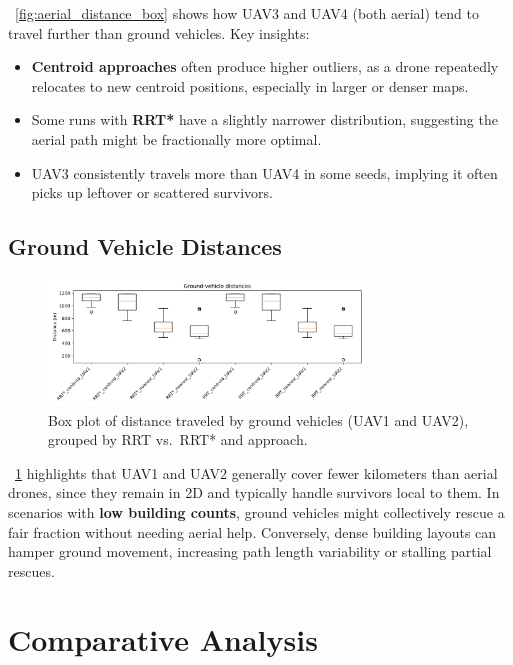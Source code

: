 \documentclass[12pt,a4paper]{report}
\begin{document}
\noindent
\figurename~\ref{fig:aerial_distance_box} shows how UAV3 and UAV4 (both aerial) 
tend to travel further than ground vehicles. Key insights:
\begin{itemize}
    \item \textbf{Centroid approaches} often produce higher outliers, as a drone 
          repeatedly relocates to new centroid positions, especially in larger or denser maps.
    \item Some runs with \textbf{RRT*} have a slightly narrower distribution, 
          suggesting the aerial path might be fractionally more optimal.
    \item UAV3 consistently travels more than UAV4 in some seeds, implying it 
          often picks up leftover or scattered survivors.
\end{itemize}

\subsection{Ground Vehicle Distances}
\begin{figure}[H]
    \centering
    \includegraphics[width=0.75\textwidth]{figures/ground_distance_box.png}
    \caption{Box plot of distance traveled by ground vehicles (UAV1 and UAV2), 
             grouped by RRT vs.\ RRT* and approach.}
    \label{fig:ground_distance_box}
\end{figure}

\noindent
\figurename~\ref{fig:ground_distance_box} highlights that UAV1 and UAV2 generally 
cover fewer kilometers than aerial drones, since they remain in 2D and typically 
handle survivors local to them. In scenarios with \textbf{low building counts}, 
ground vehicles might collectively rescue a fair fraction without needing aerial help. 
Conversely, dense building layouts can hamper ground movement, increasing path length 
variability or stalling partial rescues.

\section{Comparative Analysis}
\label{sec:analysis}
\end{document}
